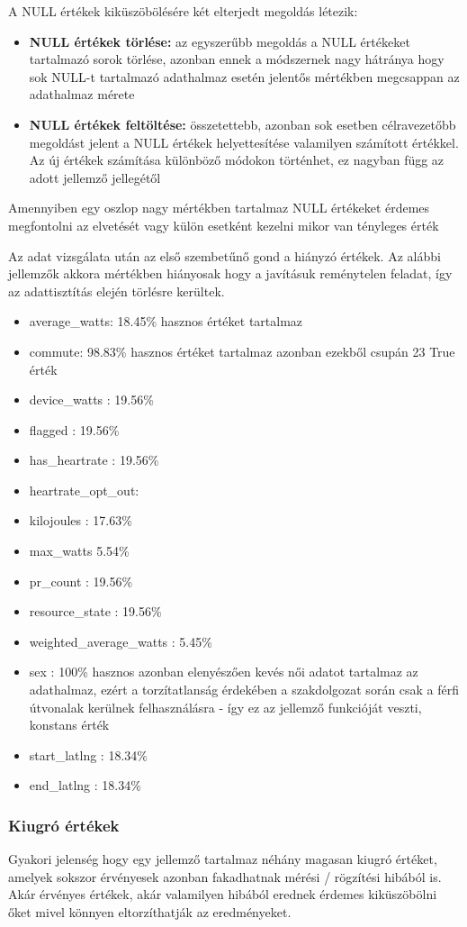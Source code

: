 A NULL értékek kiküszöbölésére két elterjedt megoldás létezik:
\begin{itemize}
	\item \textbf{NULL értékek törlése:} az egyszerűbb megoldás a NULL értékeket tartalmazó sorok törlése, azonban ennek a módszernek nagy hátránya hogy sok NULL-t tartalmazó adathalmaz esetén jelentős mértékben megcsappan az adathalmaz mérete
	\item \textbf{NULL értékek feltöltése:} összetettebb, azonban sok esetben célravezetőbb megoldást jelent a NULL értékek helyettesítése valamilyen számított értékkel. Az új értékek számítása különböző módokon történhet, ez nagyban függ az adott jellemző jellegétől
\end{itemize}
Amennyiben egy oszlop nagy mértékben tartalmaz NULL értékeket érdemes megfontolni az elvetését vagy külön esetként kezelni mikor van tényleges érték

Az adat vizsgálata után az első szembetűnő gond a hiányzó értékek. Az alábbi jellemzők akkora mértékben hiányosak hogy a javításuk reménytelen feladat, így az adattisztítás elején törlésre kerültek.
\begin{itemize}
	\item average\_watts: 18.45\% hasznos értéket tartalmaz
	\item commute: 98.83\% hasznos értéket tartalmaz azonban ezekből csupán 23 True érték
	\item device\_watts : 19.56\%
	\item flagged : 19.56\%
	\item has\_heartrate : 19.56\%
	\item heartrate\_opt\_out: 
	\item kilojoules : 17.63\%
	\item max\_watts 5.54\%
	\item pr\_count : 19.56\%
	\item resource\_state : 19.56\%
	\item weighted\_average\_watts : 5.45\%
	\item sex : 100\% hasznos azonban elenyészően kevés női adatot tartalmaz az adathalmaz, ezért a torzítatlanság érdekében a szakdolgozat során csak a férfi útvonalak kerülnek felhasználásra - így ez az jellemző funkcióját veszti, konstans érték
	\item start\_latlng : 18.34\%
	\item end\_latlng : 18.34\%
\end{itemize}


\subsubsection{Kiugró értékek}
Gyakori jelenség hogy egy jellemző tartalmaz néhány magasan kiugró értéket, amelyek sokszor érvényesek azonban fakadhatnak mérési / rögzítési hibából is. Akár érvényes értékek, akár valamilyen hibából erednek érdemes kiküszöbölni őket mivel könnyen eltorzíthatják az eredményeket. 

